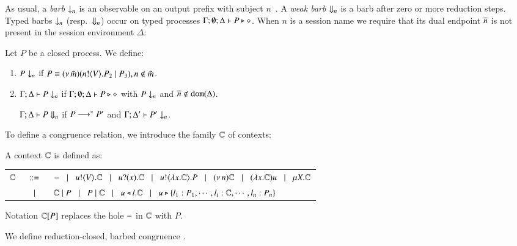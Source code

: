 \documentclass[runningheads]{llncs}
\begin{document}

\noi As usual, a \emph{barb} $\downarrow_{n}$ is an observable on an output prefix with subject $n$~\cite{MiSa92}.
A \emph{weak barb} $\Downarrow_{n}$ is a barb after zero or more reduction steps.
Typed barbs $\downarrow_{n}$ (resp.\ $\Downarrow_{n}$)
occur on typed processes $\Gamma; \emptyset; \Delta \vdash P \triangleright \diamond$.
When $n$ is a session name we require that its dual endpoint $\overline{n}$ is not present
in the session environment $\Delta$:

\begin{definition}[Barbs]\rm
	Let $P$ be a closed process. We define:
	\begin{enumerate}
		\item	
		$P \downarrow_{n}$ if $P \equiv (\nu\, \tilde{m})(n ! \langle V \rangle . P_2 \;|\; P_3), n \notin \tilde{m}$. %

		\item	$\Gamma; \Delta \vdash P \downarrow_{n}$ if
			$\Gamma; \emptyset; \Delta \vdash P \triangleright \diamond$ with $P \downarrow_{n}$ and $\overline{n} \notin \mathtt{dom}(\Delta)$.

			$\Gamma; \Delta \vdash P \Downarrow_{n}$ if $P \longrightarrow^* P'$ and
			$\Gamma; \Delta' \vdash P' \downarrow_{n}$.			
	\end{enumerate}
\end{definition}


\noi 

To define a congruence relation, we introduce the family ${\Bbb C}$ of contexts:

\begin{definition}[Context]
	A context ${\Bbb C}$ is defined as:

	\begin{tabular}{rcl}
		${\Bbb C}$ & $\;\;::=\;\;$ & $- \;\;\;|\;\;\; u ! \langle V \rangle . {\Bbb C} \;\;\;|\;\;\; u ? (x) . {\Bbb C} \;\;\;|\;\;\; u ! \langle \lambda x.{\Bbb C} \rangle . P \;\;\;|\;\;\; (\nu\, n) {\Bbb C}
		\;\;\;|\;\;\; (\lambda x.{\Bbb C})u \;\;\;|\;\;\; \mu X. {\Bbb C}$ 
		\\
		&$\;\;\;|\;\;\;$& ${\Bbb C} \;|\; P \;\;\;|\;\;\; P \;|\; {\Bbb C}
		\;\;\;|\;\;\; u \triangleleft l . {\Bbb C} \;\;\;|\;\;\; u \triangleright \{l_1:P_1,\cdots,l_i:{\Bbb C},\cdots,l_n:P_n\}$
	\end{tabular}

\noi 
Notation ${\Bbb C}[P]$ replaces 
the hole $-$ in ${\Bbb C}$ with $P$.
\end{definition}


\noi We define reduction-closed, barbed congruence \cite{HondaKYoshida95}. 
\end{document}
